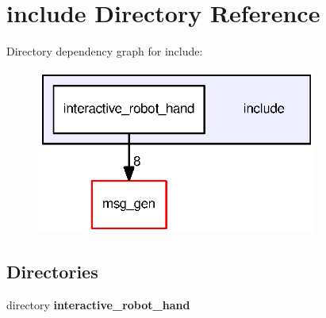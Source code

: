 \section{include Directory Reference}
\label{dir_d44c64559bbebec7f509842c48db8b23}
Directory dependency graph for include\-:\nopagebreak
\begin{figure}[H]
\begin{center}
\leavevmode
\includegraphics[width=262pt]{dir_d44c64559bbebec7f509842c48db8b23_dep}
\end{center}
\end{figure}
\subsection*{Directories}
\begin{DoxyCompactItemize}
\item 
directory {\bf interactive\-\_\-robot\-\_\-hand}
\end{DoxyCompactItemize}

